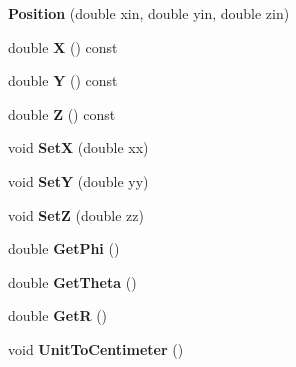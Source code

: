 \begin{DoxyCompactItemize}
\item 
\hypertarget{classPosition_a324c80892d3dcba7c99319102f9ca9ed}{
{\bfseries Position} (double xin, double yin, double zin)}
\label{classPosition_a324c80892d3dcba7c99319102f9ca9ed}

\item 
\hypertarget{classPosition_a7d829a2e612447d00d7965714045bb9a}{
double {\bfseries X} () const }
\label{classPosition_a7d829a2e612447d00d7965714045bb9a}

\item 
\hypertarget{classPosition_a2d318ced6e936e9c18225a290a32fdcb}{
double {\bfseries Y} () const }
\label{classPosition_a2d318ced6e936e9c18225a290a32fdcb}

\item 
\hypertarget{classPosition_aa57d77c97e6a3ef617ff5227053de6af}{
double {\bfseries Z} () const }
\label{classPosition_aa57d77c97e6a3ef617ff5227053de6af}

\item 
\hypertarget{classPosition_a3ea3a7594f1c164ceb06053f0e3fac02}{
void {\bfseries SetX} (double xx)}
\label{classPosition_a3ea3a7594f1c164ceb06053f0e3fac02}

\item 
\hypertarget{classPosition_a6a288f1fe2c5f642bba613828f2f38e2}{
void {\bfseries SetY} (double yy)}
\label{classPosition_a6a288f1fe2c5f642bba613828f2f38e2}

\item 
\hypertarget{classPosition_a70362eb60d97b0229f234f3e72fbf625}{
void {\bfseries SetZ} (double zz)}
\label{classPosition_a70362eb60d97b0229f234f3e72fbf625}

\item 
\hypertarget{classPosition_aeb4bd6d16d803853b477d9fb08078619}{
double {\bfseries GetPhi} ()}
\label{classPosition_aeb4bd6d16d803853b477d9fb08078619}

\item 
\hypertarget{classPosition_a2abfd5065053d48f6d7808b1b024a07e}{
double {\bfseries GetTheta} ()}
\label{classPosition_a2abfd5065053d48f6d7808b1b024a07e}

\item 
\hypertarget{classPosition_a9d6bafb2c4b8e4a69aed1ec717f0a898}{
double {\bfseries GetR} ()}
\label{classPosition_a9d6bafb2c4b8e4a69aed1ec717f0a898}

\item 
\hypertarget{classPosition_a917945e24d7307e45658e0d45596eab9}{
void {\bfseries UnitToCentimeter} ()}
\label{classPosition_a917945e24d7307e45658e0d45596eab9}


\end{DoxyCompactItemize}
